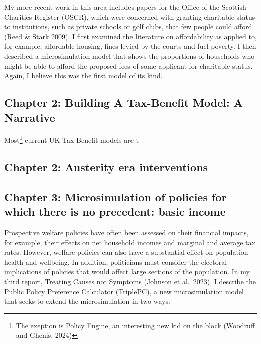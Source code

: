 \documentclass[
  letterpaper,
  DIV=11,
  numbers=noendperiod]{scrartcl}
\begin{document}
My more recent work in this area includes papers for the Office of the
Scottish Charities Register (OSCR), which were concerned with granting
charitable status to institutions, such as private schools or golf
clubs, that few people could afford (Reed \& Stark 2009). I first
examined the literature on affordability as applied to, for example,
affordable housing, fines levied by the courts and fuel poverty. I then
described a microsimulation model that shows the proportions of
households who might be able to afford the proposed fees of some
applicant for charitable status. Again, I believe this was the first
model of its kind.

\subsection{Chapter 2: Building A Tax-Benefit Model: A
Narrative}\label{chapter-2-building-a-tax-benefit-model-a-narrative}

Most\footnote{The exeption is Policy Engine, an interesting new kid on
  the block (Woodruff and Ghenis, 2024)} current UK Tax Benefit models
are t

\subsection{Chapter 2: Austerity era
interventions}\label{chapter-2-austerity-era-interventions}

\subsection{Chapter 3: Microsimulation of policies for which there is no
precedent: basic
income}\label{chapter-3-microsimulation-of-policies-for-which-there-is-no-precedent-basic-income}

Prospective welfare policies have often been assessed on their financial
impacts, for example, their effects on net household incomes and
marginal and average tax rates. However, welfare policies can also have
a substantial effect on population health and wellbeing. In addition,
politicians must consider the electoral implications of policies that
would affect large sections of the population. In my third report,
Treating Causes not Symptoms (Johnson et al.~2023), I describe the
Public Policy Preference Calculator (TriplePC), a new microsimulation
model that seeks to extend the microsimulation in two ways.
\end{document}
